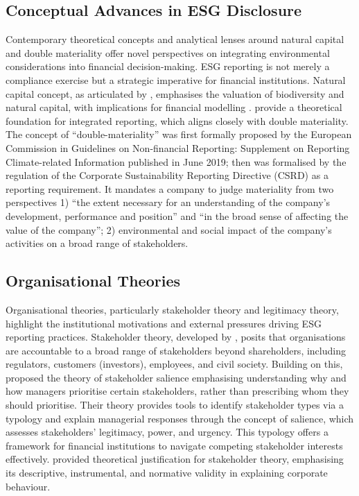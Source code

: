 \documentclass[
  authoryear]{elsarticle}
\begin{document}
\subsection{Conceptual Advances in ESG
Disclosure}\label{conceptual-advances-in-esg-disclosure}

Contemporary theoretical concepts and analytical lenses around natural
capital and double materiality offer novel perspectives on integrating
environmental considerations into financial decision-making. ESG
reporting is not merely a compliance exercise but a strategic imperative
for financial institutions. Natural capital concept, as articulated by
\citet{DASGUPTA2021}, emphasises the valuation of biodiversity and
natural capital, with implications for financial modelling
\citep{ATKINSON2014}. \citet{ECCLES2014} provide a theoretical
foundation for integrated reporting, which aligns closely with double
materiality. The concept of ``double-materiality'' was first formally
proposed by the European Commission \citep{EC2019} in Guidelines on
Non-financial Reporting: Supplement on Reporting Climate-related
Information published in June 2019; then was formalised by the
regulation of the Corporate Sustainability Reporting Directive
(CSRD)\citep[see][]{EU_CSRD_2022} as a reporting requirement. It
mandates a company to judge materiality from two perspectives 1) ``the
extent necessary for an understanding of the company's development,
performance and position'' and ``in the broad sense of affecting the
value of the company''; 2) environmental and social impact of the
company's activities on a broad range of stakeholders.

\subsection{Organisational Theories}\label{organisational-theories}

Organisational theories, particularly stakeholder theory and legitimacy
theory, highlight the institutional motivations and external pressures
driving ESG reporting practices. Stakeholder theory, developed by
\citet{FREEMAN1984}, posits that organisations are accountable to a
broad range of stakeholders beyond shareholders, including regulators,
customers (investors), employees, and civil society. Building on this,
\citet{MITCHELL1997} proposed the theory of stakeholder salience
emphasising understanding why and how managers prioritise certain
stakeholders, rather than prescribing whom they should prioritise. Their
theory provides tools to identify stakeholder types via a typology and
explain managerial responses through the concept of salience, which
assesses stakeholders' legitimacy, power, and urgency. This typology
offers a framework for financial institutions to navigate competing
stakeholder interests effectively. \citet{DONALDSON1995} provided
theoretical justification for stakeholder theory, emphasising its
descriptive, instrumental, and normative validity in explaining
corporate behaviour.
\end{document}
